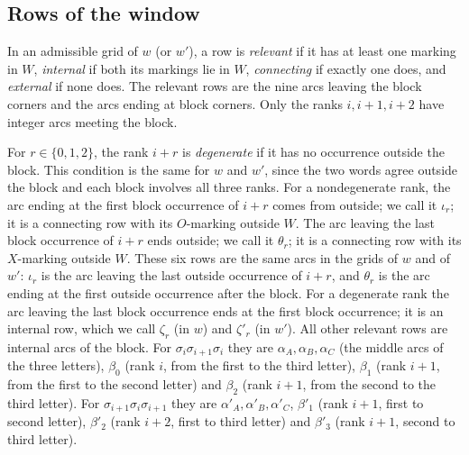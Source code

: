 \documentclass[11pt]{amsart}
\theoremstyle{definition}
\theoremstyle{remark}
\begin{document}
\subsection{Rows of the window}
In an admissible grid of $w$ (or $w'$), a row is \emph{relevant} if it has at least one marking in
$W$, \emph{internal} if both its markings lie in $W$, \emph{connecting} if exactly one does, and
\emph{external} if none does. The relevant rows are the nine arcs leaving the block corners and the
arcs ending at block corners. Only the ranks $i,i+1,i+2$ have integer arcs meeting the block.

For $r\in\{0,1,2\}$, the rank $i+r$ is \emph{degenerate} if it has no occurrence outside the block.
This condition is the same for $w$ and $w'$, since the two words agree outside the block and each
block involves all three ranks. For a nondegenerate rank, the arc ending at the first block occurrence
of $i+r$ comes from outside; we call it $\iota_r$; it is a connecting row with its $O$-marking outside
$W$. The arc leaving the last block occurrence of $i+r$ ends outside; we call it $\theta_r$; it is a
connecting row with its $X$-marking outside $W$. These six rows are the same arcs in the grids of $w$
and of $w'$: $\iota_r$ is the arc leaving the last outside occurrence of $i+r$, and $\theta_r$ is the
arc ending at the first outside occurrence after the block. For a degenerate rank the arc leaving the
last block occurrence ends at the first block occurrence; it is an internal row, which we call
$\zeta_r$ (in $w$) and $\zeta'_r$ (in $w'$). All other relevant rows are internal arcs of the block.
For $\sigma_i\sigma_{i+1}\sigma_i$ they are $\alpha_A,\alpha_B,\alpha_C$ (the middle arcs of the three
letters), $\beta_0$ (rank $i$, from the first to the third letter), $\beta_1$ (rank $i+1$, from the
first to the second letter) and $\beta_2$ (rank $i+1$, from the second to the third letter). For
$\sigma_{i+1}\sigma_i\sigma_{i+1}$ they are $\alpha'_A,\alpha'_B,\alpha'_C$, $\beta'_1$ (rank $i+1$,
first to second letter), $\beta'_2$ (rank $i+2$, first to third letter) and $\beta'_3$ (rank $i+1$,
second to third letter).
\end{document}
